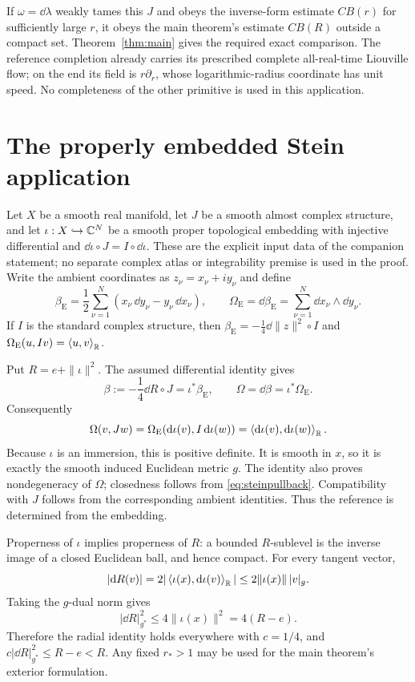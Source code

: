 If $\omega=\dd\lambda$ weakly tames this $J$ and obeys the
inverse-form estimate $CB(r)$ for sufficiently large $r$,
it obeys the main theorem's estimate $CB(R)$ outside a compact
set. Theorem~\ref{thm:main} gives the required exact comparison.
The reference completion already carries its prescribed complete
all-real-time Liouville flow; on the end its field is
$r\partial_r$, whose logarithmic-radius coordinate has unit speed.
No completeness of the other primitive
is used in this application.

\section{The properly embedded Stein application}
Let $X$ be a smooth real manifold, let $J$ be a smooth almost complex
structure, and let $\iota:X\hookrightarrow\mathbb C^N$ be a smooth proper
topological embedding with injective differential and
$\dd\iota\circ J=I\circ\dd\iota$.
These are the explicit input data of the companion statement; no
separate complex atlas or integrability premise is used in the proof.
Write the ambient coordinates as $z_\nu=x_\nu+iy_\nu$ and define
\[
 \beta_{\mathrm{E}}=\frac12\sum_{\nu=1}^N
   (x_\nu\,\dd y_\nu-y_\nu\,\dd x_\nu),\qquad
 \Omega_{\mathrm{E}}=\dd\beta_{\mathrm{E}}
   =\sum_{\nu=1}^N\dd x_\nu\wedge\dd y_\nu .
\]
If $I$ is the standard complex structure, then
$\beta_{\mathrm{E}}=-\frac14\dd\|z\|^2\circ I$ and
$\Omega_{\mathrm{E}}(u,Iv)=\left\langle u,v\right\rangle_{\mathbb R}$.

Put $R=e+\|\iota\|^2$.
The assumed differential identity gives
\begin{equation}\label{eq:steinpullback}
 \beta:=-\frac14\dd R\circ J=\iota^*\beta_{\mathrm{E}},
 \qquad \Omega=\dd\beta=\iota^*\Omega_{\mathrm{E}}.
\end{equation}
Consequently
\[
 \Omega(v,Jw)=
 \Omega_{\mathrm{E}}(\mathrm d\iota(v),I\,\mathrm d\iota(w))
 =\left\langle\mathrm d\iota(v),\mathrm d\iota(w)\right\rangle_{\mathbb R}.
\]
Because $\iota$ is an immersion, this is positive definite.
It is smooth in $x$, so it is exactly the smooth induced
Euclidean metric $g$. The identity also proves nondegeneracy
of $\Omega$; closedness follows from \eqref{eq:steinpullback}.
Compatibility with $J$ follows from the corresponding ambient
identities. Thus the reference is determined from the embedding.

Properness of $\iota$ implies properness of $R$: a bounded
$R$-sublevel is the inverse image of a closed Euclidean ball,
and hence compact.
For every tangent vector,
\[
 |\mathrm d R(v)|=2|\left\langle\iota(x),\mathrm d\iota(v)\right\rangle_{\mathbb R}|
 \le2\|\iota(x)\|\,|v|_g .
\]
Taking the $g$-dual norm gives
\[
 |\dd R|_{g^*}^2\le4\|\iota(x)\|^2=4(R-e).
\]
Therefore the radial identity holds everywhere with $c=1/4$,
and $c|\dd R|_{g^*}^2\le R-e<R$.
Any fixed $r_*>1$ may be used for the main theorem's exterior
formulation.

